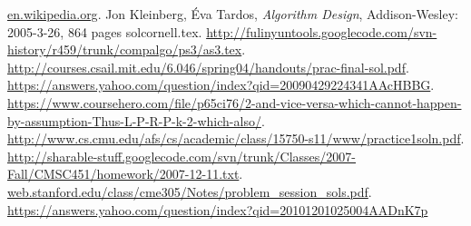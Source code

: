 \documentclass[11pt]{article}
\theoremstyle{numberplain}
\theoremstyle{nonumberplain}
\newcommand{\0}{{\mathbf{0}}}
\begin{document}

\begin{thebibliography}{10}
 \href{en.wikipedia.org}{en.wikipedia.org}.
 Jon Kleinberg, Éva Tardos, \textit{Algorithm Design}, Addison-Wesley: 2005-3-26, 864 pages
 solcornell.tex.
\href{http://fulinyuntools.googlecode.com/svn-history/r459/trunk/compalgo/ps3/as3.tex}{http://fulinyuntools.googlecode.com/svn-history/r459/trunk/compalgo/ps3/as3.tex}.
\href{http://courses.csail.mit.edu/6.046/spring04/handouts/prac-final-sol.pdf}{http://courses.csail.mit.edu/6.046/spring04/handouts/prac-final-sol.pdf}.
 \href{https://answers.yahoo.com/question/index?qid=20090429224341AAcHBBG}{https://answers.yahoo.com/question/index?qid=20090429224341AAcHBBG}.
 \href{https://www.coursehero.com/file/p65ci76/2-and-vice-versa-which-cannot-happen-by-assumption-Thus-L-P-R-P-k-2-which-also/}{https://www.coursehero.com/file/p65ci76/2-and-vice-versa-which-cannot-happen-by-assumption-Thus-L-P-R-P-k-2-which-also/}.
\href{http://www.cs.cmu.edu/afs/cs/academic/class/15750-s11/www/practice1soln.pdf}{http://www.cs.cmu.edu/afs/cs/academic/class/15750-s11/www/practice1soln.pdf}.
\href{http://sharable-stuff.googlecode.com/svn/trunk/Classes/2007-Fall/CMSC451/homework/2007-12-11.txt}{http://sharable-stuff.googlecode.com/svn/trunk/Classes/2007-Fall/CMSC451/homework/2007-12-11.txt}.
\href{web.stanford.edu/class/cme305/Notes/problem\_session\_sols.pdf}{web.stanford.edu/class/cme305/Notes/problem\_session\_sols.pdf}.
 \href{https://answers.yahoo.com/question/index?qid=20101201025004AADnK7p}{https://answers.yahoo.com/question/index?qid=20101201025004AADnK7p}
\end{thebibliography}
\end{document}
